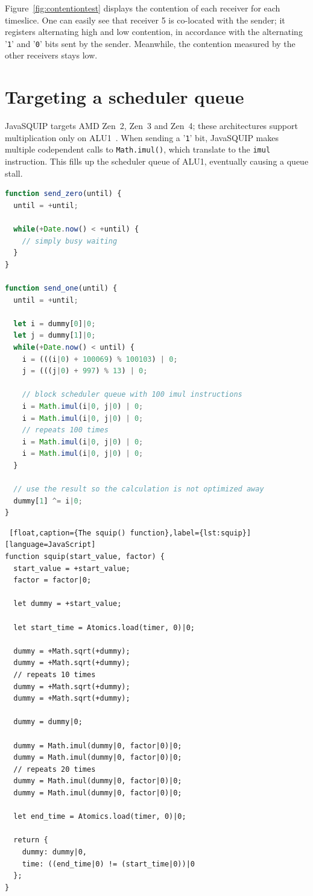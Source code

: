 \documentclass[11pt,
  titlepage=false,
  parskip=half,      %
]{scrreprt}
\begin{document}
Figure~\ref{fig:contentiontest} displays the contention of each receiver for each timeslice.
One can easily see that receiver 5 is co-located with the sender;
it registers alternating high and low contention, in accordance with the alternating '\texttt{1}' and '\texttt{0}' bits sent by the sender.
Meanwhile, the contention measured by the other receivers stays low.

\section{Targeting a scheduler queue}
JavaSQUIP targets AMD Zen~2, Zen~3 and Zen~4;
these architectures support multiplication only on ALU1~\cite{AMD2020OptimizationEPYC7003}.
When sending a '\texttt{1}' bit, JavaSQUIP makes multiple codependent calls to \texttt{Math.imul()}, which translate to the \texttt{imul} instruction.
This fills up the scheduler queue of ALU1, eventually causing a queue stall.

\begin{lstlisting}[float,caption={The functions \texttt{send\_zero()} and \texttt{send\_one()}},label={lst:sendzeroone},language=JavaScript]
function send_zero(until) {
  until = +until;

  while(+Date.now() < +until) {
    // simply busy waiting
  }
}

function send_one(until) {
  until = +until;

  let i = dummy[0]|0;
  let j = dummy[1]|0;
  while(+Date.now() < until) {
    i = (((i|0) + 100069) % 100103) | 0;
    j = (((j|0) + 997) % 13) | 0;

    // block scheduler queue with 100 imul instructions
    i = Math.imul(i|0, j|0) | 0;
    i = Math.imul(i|0, j|0) | 0;
    // repeats 100 times
    i = Math.imul(i|0, j|0) | 0;
    i = Math.imul(i|0, j|0) | 0;
  }

  // use the result so the calculation is not optimized away
  dummy[1] ^= i|0;
}
\end{lstlisting}

\begin{lstlisting} [float,caption={The squip() function},label={lst:squip}][language=JavaScript]
function squip(start_value, factor) {
  start_value = +start_value;
  factor = factor|0;

  let dummy = +start_value;

  let start_time = Atomics.load(timer, 0)|0;

  dummy = +Math.sqrt(+dummy);
  dummy = +Math.sqrt(+dummy);
  // repeats 10 times
  dummy = +Math.sqrt(+dummy);
  dummy = +Math.sqrt(+dummy);

  dummy = dummy|0;

  dummy = Math.imul(dummy|0, factor|0)|0;
  dummy = Math.imul(dummy|0, factor|0)|0;
  // repeats 20 times
  dummy = Math.imul(dummy|0, factor|0)|0;
  dummy = Math.imul(dummy|0, factor|0)|0;

  let end_time = Atomics.load(timer, 0)|0;

  return {
    dummy: dummy|0,
    time: ((end_time|0) != (start_time|0))|0
  };
}
\end{lstlisting}
\end{document}
